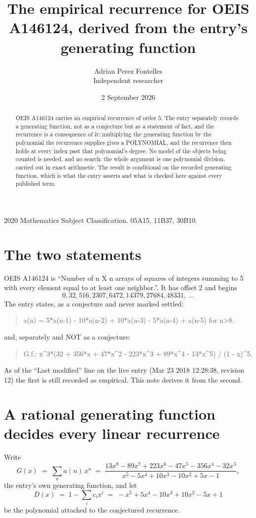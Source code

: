 \documentclass[11pt,a4paper]{article}
\title{The empirical recurrence for OEIS A146124, derived from the entry's generating function}
\author{Adrian Perez Fontelles\\ \small Independent researcher}
\date{2 September 2026}
\theoremstyle{plain}
\theoremstyle{definition}
\begin{document}
\maketitle

\begin{abstract}
OEIS A146124 carries an empirical recurrence of order $5$. The entry separately records a
generating function, not as a conjecture but as a statement of fact, and the recurrence is a
consequence of it: multiplying the generating function by the polynomial the recurrence
supplies gives a POLYNOMIAL, and the recurrence then holds at every index past that
polynomial's degree. No model of the objects being counted is needed, and no search: the
whole argument is one polynomial division, carried out in exact arithmetic. The result is
conditional on the recorded generating function, which is what the entry asserts and what is
checked here against every published term.
\end{abstract}

\noindent\small 2020 Mathematics Subject Classification. 05A15, 11B37, 30B10.\normalsize

\section{The two statements}

OEIS A146124 is ``Number of n X n arrays of squares of integers summing to 5 with every element equal to at least one neighbor.''. It has offset $2$ and begins
\[
0, 32, 516, 2307, 6472, 14379, 27684, 48331,\ \dots
\]
The entry states, as a conjecture and never marked settled:
\begin{quote}
a(n) = 5*a(n-1) - 10*a(n-2) + 10*a(n-3) - 5*a(n-4) + a(n-5) for n>8.
\end{quote}
and, separately and NOT as a conjecture:
\begin{quote}
G.f.: x\^{}3*(32 + 356*x + 47*x\^{}2 - 223*x\^{}3 + 89*x\^{}4 - 13*x\^{}5) / (1 - x)\^{}5.
\end{quote}
As of the ``Last modified'' line on the live entry (Mar 23 2018 12:28:38, revision 12) the first is still
recorded as empirical. This note derives it from the second.

\section{A rational generating function decides every linear recurrence}

Write
\[
G(x)\;=\;\sum_{n}a(n)\,x^{n}\;=\;\frac{13 x^{8} - 89 x^{7} + 223 x^{6} - 47 x^{5} - 356 x^{4} - 32 x^{3}}{x^{5} - 5 x^{4} + 10 x^{3} - 10 x^{2} + 5 x - 1},
\]
the entry's own generating function, and let
\[
D(x)\;=\;1-\sum_i c_i x^{i}\;=\;- x^{5} + 5 x^{4} - 10 x^{3} + 10 x^{2} - 5 x + 1
\]
be the polynomial attached to the conjectured recurrence.
\end{document}

